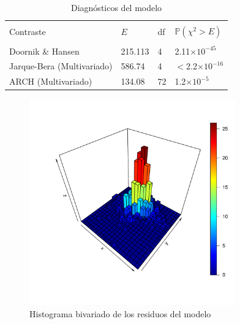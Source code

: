 \documentclass[12pt, twoside]{book}\usepackage[]{graphicx}\usepackage[]{color}
\newenvironment{knitrout}{}{} %
\numberwithin{equation}{section}
\numberwithin{theorem}{section}
\numberwithin{teorema}{section}
\numberwithin{defi}{section}
\numberwithin{prop}{section}
\numberwithin{defi}{section}
\theoremstyle{plain}
\begin{document}
\begin{table}[h]
\centering
\caption{Diagnósticos del modelo}
\begin{tabular}{@{}llll@{}}
\toprule \\ 
Contraste   & $E$ & df & $\mathbb{P}(\chi^{2}>E)$ \\
\midrule \\ 
Doornik \& Hansen & 215.113 & 4 & 2.11$\times 10^{-45}$ \\
Jarque-Bera (Multivariado) & 586.74 & 4 & $<$2.2$\times 10^{-16}$ \\
ARCH (Multivariado) & 134.08 & 72 & 1.2$\times 10^{-5}$ \\ 

\bottomrule 
\end{tabular}
\end{table}





\begin{knitrout}
\color{fgcolor}\begin{figure}[H]

{\centering \includegraphics[width=3.5in,height=3.5in]{figure/fig-5_3_1-1} 

}

\caption[Histograma bivariado de los residuos del modelo]{Histograma bivariado de los residuos del modelo}\label{fig:fig-5.3.1}
\end{figure}


\end{knitrout}
\end{document}

